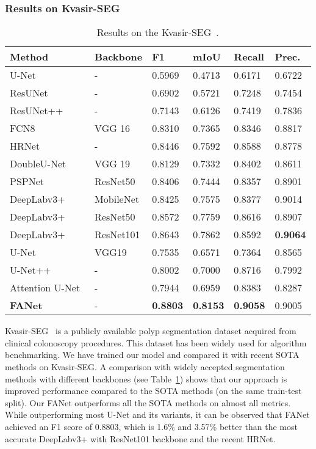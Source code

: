 \documentclass[journal]{IEEEtran}
\begin{document}
\subsubsection{Results on Kvasir-SEG} 
\begin{table}[!t]
\footnotesize
\caption{Results on the Kvasir-SEG~\cite{jha2020kvasir}.}
\begin{tabular}{@{}l|l|l|l|l|l@{}}
\toprule
\textbf{Method} &\textbf{Backbone} &\textbf{F1} &\textbf{mIoU} &\textbf{Recall}& \textbf{Prec.} \\ 
\midrule
{U-Net}~\cite{ronneberger2015u} & - & 0.5969 & 0.4713 & 0.6171 & 0.6722 \\ ResUNet~\cite{zhang2018road} & - & 0.6902 & 0.5721 & 0.7248 & 0.7454 \\ {ResUNet++}~\cite{jha2019resunet++} & - & 0.7143 & 0.6126 & 0.7419 & 0.7836 \\{FCN8}~\cite{long2015fully}  &  VGG 16 & 0.8310 & 0.7365 & 0.8346 & 0.8817 \\HRNet~\cite{wang2020deep}& - & 0.8446 & 0.7592 & 0.8588 & 0.8778 \\ {DoubleU-Net}~\cite{jha2020doubleu} & VGG 19 & 0.8129 & 0.7332 & 0.8402 & 0.8611 \\ {PSPNet}~\cite{zhao2017pyramid}  & ResNet50 & 0.8406 & 0.7444 & 0.8357 & 0.8901 \\ DeepLabv3+~\cite{chen2018encoder} & MobileNet & 0.8425 & 0.7575 & 0.8377 & 0.9014 \\ {DeepLabv3+}~\cite{chen2018encoder} & ResNet50 & 0.8572 & 0.7759 & 0.8616 & 0.8907 \\ {DeepLabv3+}~\cite{chen2018encoder}& ResNet101 & 0.8643 & 0.7862 & 0.8592 & \textbf{0.9064} \\ 
U-Net~\cite{ronneberger2015u} & VGG19 & 0.7535 & 0.6571 & 0.7364 & 0.8565 \\ U-Net++~\cite{zhou2018unet++} & - & 0.8002 & 0.7000 & 0.8716 & 0.7992 \\ Attention U-Net~\cite{oktay2018attention} & - & 0.7944 & 0.6959 & 0.8383 & 0.8287 \\ \textbf{FANet} & - & \textbf{0.8803} & \textbf{0.8153} & \textbf{0.9058} & 0.9005 \\ 
\bottomrule
\end{tabular}
\label{tab:kvasirseg}
\end{table}

Kvasir-SEG~\cite{jha2020kvasir} is a publicly available polyp segmentation dataset acquired from clinical colonoscopy procedures. This dataset has been widely used for algorithm benchmarking. We have trained our model and compared it with recent \ac{SOTA} methods on Kvasir-SEG. A comparison with widely accepted segmentation methods with different backbones (see Table~\ref{tab:kvasirseg}) shows that our approach is improved performance compared to the \ac{SOTA} methods (on the same train-test split). Our FANet outperforms all the \ac{SOTA} methods on almost all metrics. While outperforming most U-Net and its variants, it can be observed that FANet achieved an F1 score of 0.8803, which is 1.6\% and 3.57\% better than the most accurate DeepLabv3+ with ResNet101 backbone and the recent HRNet. 
\end{document}
